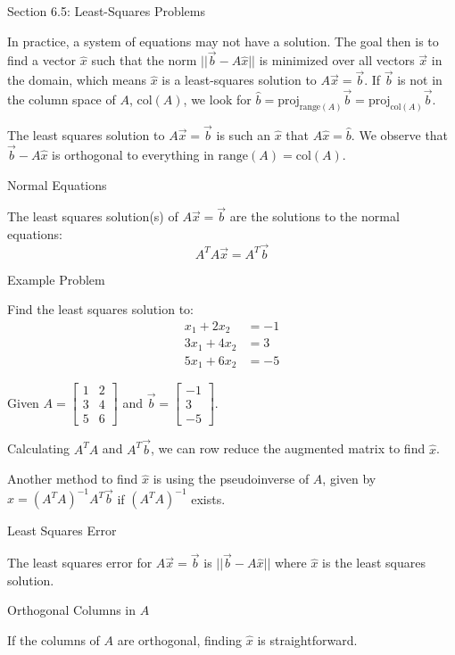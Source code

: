 \documentclass{article}
\begin{document}
Section 6.5: Least-Squares Problems

In practice, a system of equations may not have a solution. The goal then is to find a vector $\hat{x}$ such that the norm $||\vec{b} - A\hat{x}||$ is minimized over all vectors $\vec{x}$ in the domain, which means $\hat{x}$ is a least-squares solution to $A\vec{x} = \vec{b}$. If $\vec{b}$ is not in the column space of $A$, $\text{col}(A)$, we look for $\hat{b} = \text{proj}_{\text{range}(A)} \vec{b} = \text{proj}_{\text{col}(A)} \vec{b}$.

The least squares solution to $A\vec{x} = \vec{b}$ is such an $\hat{x}$ that $A\hat{x} = \hat{b}$. We observe that $\vec{b} - A\hat{x}$ is orthogonal to everything in $\text{range}(A) = \text{col}(A)$.

Normal Equations

The least squares solution(s) of $A\vec{x}=\vec{b}$ are the solutions to the normal equations:
\[ A^TA\vec{x} = A^T\vec{b} \]

Example Problem

Find the least squares solution to:
\begin{align*}
x_1 + 2x_2 &= -1 \\
3x_1 + 4x_2 &= 3 \\
5x_1 + 6x_2 &= -5
\end{align*}

Given $A = \begin{bmatrix}
1 & 2 \\
3 & 4 \\
5 & 6
\end{bmatrix}$ and $\vec{b} = \begin{bmatrix}
-1 \\
3 \\
-5
\end{bmatrix}$.

Calculating $A^TA$ and $A^T\vec{b}$, we can row reduce the augmented matrix to find $\hat{x}$.

Another method to find $\hat{x}$ is using the pseudoinverse of $A$, given by $\hat{x} = (A^TA)^{-1}A^T\vec{b}$ if $(A^TA)^{-1}$ exists.

Least Squares Error

The least squares error for $A\vec{x} = \vec{b}$ is $||\vec{b} - A\hat{x}||$ where $\hat{x}$ is the least squares solution.

Orthogonal Columns in $A$

If the columns of $A$ are orthogonal, finding $\hat{x}$ is straightforward.
\end{document}
